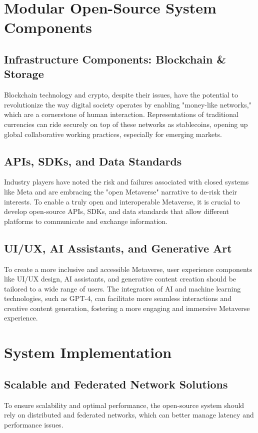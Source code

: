 \section{Modular Open-Source System Components}
\subsection{Infrastructure Components: Blockchain \& Storage}
Blockchain technology and crypto, despite their issues, have the potential to revolutionize the way digital society operates by enabling "money-like networks," which are a cornerstone of human interaction. Representations of traditional currencies can ride securely on top of these networks as stablecoins, opening up global collaborative working practices, especially for emerging markets.

\subsection{APIs, SDKs, and Data Standards}
Industry players have noted the risk and failures associated with closed systems like Meta and are embracing the "open Metaverse" narrative to de-risk their interests. To enable a truly open and interoperable Metaverse, it is crucial to develop open-source APIs, SDKs, and data standards that allow different platforms to communicate and exchange information.

\subsection{UI/UX, AI Assistants, and Generative Art}
To create a more inclusive and accessible Metaverse, user experience components like UI/UX design, AI assistants, and generative content creation should be tailored to a wide range of users. The integration of AI and machine learning technologies, such as GPT-4, can facilitate more seamless interactions and creative content generation, fostering a more engaging and immersive Metaverse experience.

\section{System Implementation}
\subsection{Scalable and Federated Network Solutions}
To ensure scalability and optimal performance, the open-source system should rely on distributed and federated networks, which can better manage latency and performance issues.
